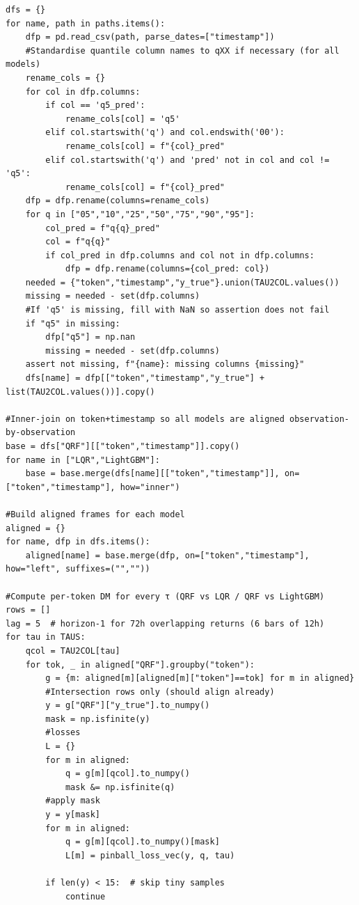 \documentclass[
  a4paper,
  DIV=11,
  numbers=noendperiod]{scrreprt}
\begin{document}
\begin{verbatim}
dfs = {}
for name, path in paths.items():
    dfp = pd.read_csv(path, parse_dates=["timestamp"])
    #Standardise quantile column names to qXX if necessary (for all models)
    rename_cols = {}
    for col in dfp.columns:
        if col == 'q5_pred':
            rename_cols[col] = 'q5'
        elif col.startswith('q') and col.endswith('00'):
            rename_cols[col] = f"{col}_pred"
        elif col.startswith('q') and 'pred' not in col and col != 'q5':
            rename_cols[col] = f"{col}_pred"
    dfp = dfp.rename(columns=rename_cols)
    for q in ["05","10","25","50","75","90","95"]:
        col_pred = f"q{q}_pred"
        col = f"q{q}"
        if col_pred in dfp.columns and col not in dfp.columns:
            dfp = dfp.rename(columns={col_pred: col})
    needed = {"token","timestamp","y_true"}.union(TAU2COL.values())
    missing = needed - set(dfp.columns)
    #If 'q5' is missing, fill with NaN so assertion does not fail
    if "q5" in missing:
        dfp["q5"] = np.nan
        missing = needed - set(dfp.columns)
    assert not missing, f"{name}: missing columns {missing}"
    dfs[name] = dfp[["token","timestamp","y_true"] + list(TAU2COL.values())].copy()

#Inner-join on token+timestamp so all models are aligned observation-by-observation
base = dfs["QRF"][["token","timestamp"]].copy()
for name in ["LQR","LightGBM"]:
    base = base.merge(dfs[name][["token","timestamp"]], on=["token","timestamp"], how="inner")

#Build aligned frames for each model
aligned = {}
for name, dfp in dfs.items():
    aligned[name] = base.merge(dfp, on=["token","timestamp"], how="left", suffixes=("",""))

#Compute per-token DM for every τ (QRF vs LQR / QRF vs LightGBM)
rows = []
lag = 5  # horizon-1 for 72h overlapping returns (6 bars of 12h)
for tau in TAUS:
    qcol = TAU2COL[tau]
    for tok, _ in aligned["QRF"].groupby("token"):
        g = {m: aligned[m][aligned[m]["token"]==tok] for m in aligned}
        #Intersection rows only (should align already)
        y = g["QRF"]["y_true"].to_numpy()
        mask = np.isfinite(y)
        #losses
        L = {}
        for m in aligned:
            q = g[m][qcol].to_numpy()
            mask &= np.isfinite(q)
        #apply mask
        y = y[mask]
        for m in aligned:
            q = g[m][qcol].to_numpy()[mask]
            L[m] = pinball_loss_vec(y, q, tau)

        if len(y) < 15:  # skip tiny samples
            continue


\end{verbatim}
\end{document}
